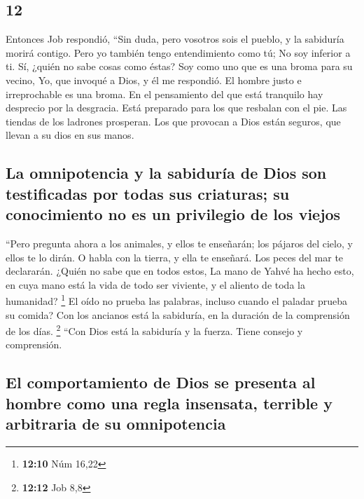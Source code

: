 \begin{paracol}{2}
\hypertarget{section-22}{%
\section{12}\label{section-22}}

 Entonces Job respondió,  ``Sin duda, pero
vosotros sois el pueblo, y la sabiduría morirá contigo. 
Pero yo también tengo entendimiento como tú; No soy inferior a ti. Sí,
¿quién no sabe cosas como éstas?  Soy como uno que es una
broma para su vecino, Yo, que invoqué a Dios, y él me respondió. El
hombre justo e irreprochable es una broma.  En el
pensamiento del que está tranquilo hay desprecio por la desgracia. Está
preparado para los que resbalan con el pie.  Las tiendas
de los ladrones prosperan. Los que provocan a Dios están seguros, que
llevan a su dios en sus manos.

\hypertarget{la-omnipotencia-y-la-sabiduruxeda-de-dios-son-testificadas-por-todas-sus-criaturas-su-conocimiento-no-es-un-privilegio-de-los-viejos}{%
\subsection{La omnipotencia y la sabiduría de Dios son testificadas por
todas sus criaturas; su conocimiento no es un privilegio de los
viejos}\label{la-omnipotencia-y-la-sabiduruxeda-de-dios-son-testificadas-por-todas-sus-criaturas-su-conocimiento-no-es-un-privilegio-de-los-viejos}}

 ``Pero pregunta ahora a los animales, y ellos te
enseñarán; los pájaros del cielo, y ellos te lo dirán.  O
habla con la tierra, y ella te enseñará. Los peces del mar te
declararán.  ¿Quién no sabe que en todos estos, La mano de
Yahvé ha hecho esto,  en cuya mano está la vida de todo
ser viviente, y el aliento de toda la humanidad? \footnote{\textbf{12:10}
  Núm 16,22}  El oído no prueba las palabras, incluso
cuando el paladar prueba su comida?  Con los ancianos
está la sabiduría, en la duración de la comprensión de los días.
\footnote{\textbf{12:12} Job 8,8}  ``Con Dios está la
sabiduría y la fuerza. Tiene consejo y comprensión.

\hypertarget{el-comportamiento-de-dios-se-presenta-al-hombre-como-una-regla-insensata-terrible-y-arbitraria-de-su-omnipotencia}{%
\subsection{El comportamiento de Dios se presenta al hombre como una
regla insensata, terrible y arbitraria de su
omnipotencia}\label{el-comportamiento-de-dios-se-presenta-al-hombre-como-una-regla-insensata-terrible-y-arbitraria-de-su-omnipotencia}}


\end{paracol}
